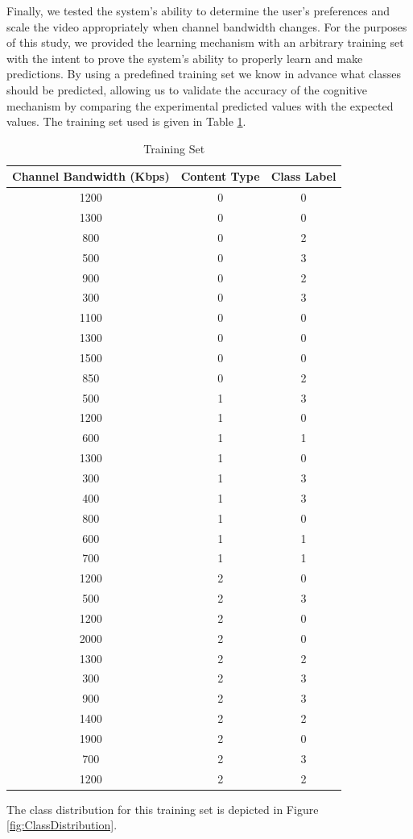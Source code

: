 \documentclass[a4paper,12pt]{article}
\begin{document}
Finally, we tested the system’s ability to determine the user’s preferences and scale the video appropriately when channel bandwidth changes. For the purposes of this study, we provided the learning mechanism with an arbitrary training set with the intent to prove the system’s ability to properly learn and make predictions. By using a predefined training set we know in advance what classes should be predicted, allowing us to validate the accuracy of the cognitive mechanism by comparing the experimental predicted values with the expected values. The training set used is given in Table \ref{tab:TrainingSet}.
\begin{table} [h]
\caption{Training Set}
\label{tab:TrainingSet}
\begin{tabular}{c|c|c}
\textbf{Channel Bandwidth (Kbps)}&\textbf{Content Type}&\textbf{Class Label}\\
\hline
1200&0&0\\
1300&0&0\\
800&0&2\\
500&0&3\\
900&0&2\\
300&0&3\\
1100&0&0\\
1300&0&0\\
1500&0&0\\
850&0&2\\
500&1&3\\
1200&1&0\\
600&1&1\\
1300&1&0\\
300&1&3\\
400&1&3\\
800&1&0\\
600&1&1\\
700&1&1\\
1200&2&0\\
500&2&3\\
1200&2&0\\
2000&2&0\\
1300&2&2\\
300&2&3\\
900&2&3\\
1400&2&2\\
1900&2&0\\
700&2&3\\
1200&2&2\\
\end{tabular}
\end{table}
The class distribution for this training set is depicted in Figure \ref{fig:ClassDistribution}.
\end{document}
